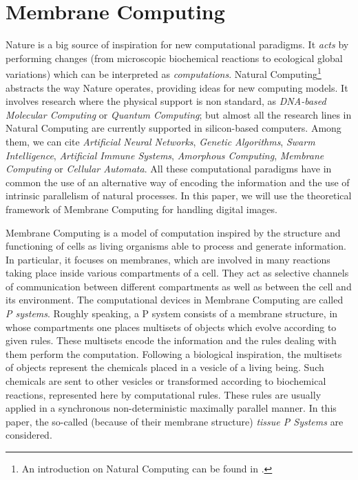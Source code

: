 \documentclass[journal]{IEEEtran}
\begin{document}
\section{Membrane Computing}\label{sec:MC}
Nature is a big source of inspiration for new computational
paradigms. It {\it acts} by performing changes (from microscopic
biochemical reactions to ecological global variations) which can be
interpreted as {\it computations}. Natural Computing\footnote{An
introduction on Natural Computing can be found in
\cite{DBLP:journals/cacm/KariR08}.} abstracts the way Nature
operates, providing ideas for new computing models. It involves
research where the physical support is non standard, as {\it
DNA-based Molecular Computing} or {\it Quantum Computing}; but
almost all the research lines in Natural Computing are currently
supported in silicon-based computers. Among them, we can cite {\it
Artificial Neural Networks}, {\it Genetic Algorithms}, {\it Swarm
Intelligence}, {\it Artificial Immune Systems}, {\it Amorphous
Computing}, {\it Membrane Computing} or {\it Cellular Automata}. All
these computational paradigms have in common the use of an
alternative way of encoding the information and the use of intrinsic
parallelism of natural processes. In this paper, we will use the
theoretical framework of Membrane Computing for handling digital
images.

Membrane Computing \cite{HandbookMC10} is a model of computation
inspired by the structure and functioning of cells as living
organisms able to process and generate information. In particular,
it focuses on membranes, which are involved in many reactions taking
place inside various compartments of a cell. They act as selective
channels of communication between different compartments as well as
between the cell and its environment. The computational devices in
Membrane Computing are called \emph{P systems}. Roughly speaking, a
P system consists of a membrane structure, in whose compartments one
places multisets of objects which evolve according to given rules.
These multisets encode the information and the rules dealing with
them perform the computation. Following a biological inspiration,
the multisets of objects represent the chemicals placed in a vesicle
of a living being. Such chemicals are sent to other vesicles or
transformed according to biochemical reactions, represented here by
computational rules. These rules are usually applied in a
synchronous non-deterministic maximally parallel manner. In this
paper, the so-called (because of their membrane structure) {\it
tissue P Systems} \cite{DBLP:journals/tcs/Martin-VidePPR03} are
considered.
\end{document}

